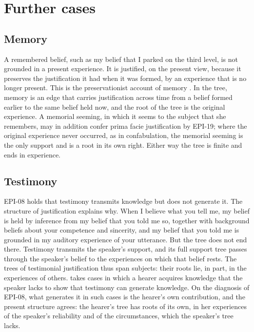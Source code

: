 \documentclass{situationist-preprint}
\begin{document}
\section{Further cases}\label{s:cases}

\subsection{Memory}

A remembered belief, such as my belief that I parked on the third level, is not grounded in a present experience. It is justified, on the present view, because it preserves the justification it had when it was formed, by an experience that is no longer present. This is the preservationist account of memory \citep{Burge1993}. In the tree, memory is an edge that carries justification across time from a belief formed earlier to the same belief held now, and the root of the tree is the original experience. A memorial seeming, in which it seems to the subject that she remembers, may in addition confer prima facie justification by EPI-19; where the original experience never occurred, as in confabulation, the memorial seeming is the only support and is a root in its own right. Either way the tree is finite and ends in experience.

\subsection{Testimony}

EPI-08 holds that testimony transmits knowledge but does not generate it. The structure of justification explains why. When I believe what you tell me, my belief is held by inference from my belief that you told me so, together with background beliefs about your competence and sincerity, and my belief that you told me is grounded in my auditory experience of your utterance. But the tree does not end there. Testimony transmits the speaker's support, and its full support tree passes through the speaker's belief to the experiences on which that belief rests. The trees of testimonial justification thus span subjects: their roots lie, in part, in the experiences of others. \citet{Lackey2008} takes cases in which a hearer acquires knowledge that the speaker lacks to show that testimony can generate knowledge. On the diagnosis of EPI-08, what generates it in such cases is the hearer's own contribution, and the present structure agrees: the hearer's tree has roots of its own, in her experiences of the speaker's reliability and of the circumstances, which the speaker's tree lacks.
\end{document}
